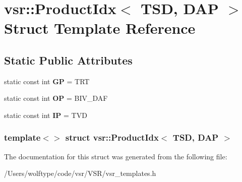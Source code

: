 \hypertarget{structvsr_1_1_product_idx_3_01_t_s_d_00_01_d_a_p_01_4}{\section{vsr\-:\-:Product\-Idx$<$ T\-S\-D, D\-A\-P $>$ Struct Template Reference}
\label{structvsr_1_1_product_idx_3_01_t_s_d_00_01_d_a_p_01_4}
}
\subsection*{Static Public Attributes}
\begin{DoxyCompactItemize}
\item 
\hypertarget{structvsr_1_1_product_idx_3_01_t_s_d_00_01_d_a_p_01_4_a087d25cc1db4861a05badfd54f106443}{static const int {\bfseries G\-P} = T\-R\-T}\label{structvsr_1_1_product_idx_3_01_t_s_d_00_01_d_a_p_01_4_a087d25cc1db4861a05badfd54f106443}

\item 
\hypertarget{structvsr_1_1_product_idx_3_01_t_s_d_00_01_d_a_p_01_4_a80f4001e3438f83883a16e6cfaa4e314}{static const int {\bfseries O\-P} = B\-I\-V\-\_\-\-D\-A\-F}\label{structvsr_1_1_product_idx_3_01_t_s_d_00_01_d_a_p_01_4_a80f4001e3438f83883a16e6cfaa4e314}

\item 
\hypertarget{structvsr_1_1_product_idx_3_01_t_s_d_00_01_d_a_p_01_4_ac1dac79b18e069bde1269bc18d2d8ad9}{static const int {\bfseries I\-P} = T\-V\-D}\label{structvsr_1_1_product_idx_3_01_t_s_d_00_01_d_a_p_01_4_ac1dac79b18e069bde1269bc18d2d8ad9}

\end{DoxyCompactItemize}
\subsubsection*{template$<$$>$ struct vsr\-::\-Product\-Idx$<$ T\-S\-D, D\-A\-P $>$}



The documentation for this struct was generated from the following file\-:\begin{DoxyCompactItemize}
\item 
/\-Users/wolftype/code/vsr/\-V\-S\-R/vsr\-\_\-templates.\-h\end{DoxyCompactItemize}
